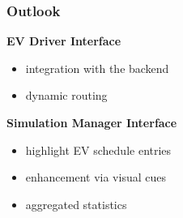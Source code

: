 \begin{frame}
	\frametitle{Outlook}

		\textbf{EV Driver Interface}
		\vspace{-4mm}
        \begin{itemize}
            \item integration with the backend
            \item dynamic routing
        \end{itemize}
	
	\vspace{6mm}
	
	\textbf{Simulation Manager Interface}
	\vspace{-4mm}
	\begin{itemize}
		\item highlight EV schedule entries
		\item enhancement via visual cues
		\item aggregated statistics
	\end{itemize}
	
\end{frame}
\clearpage